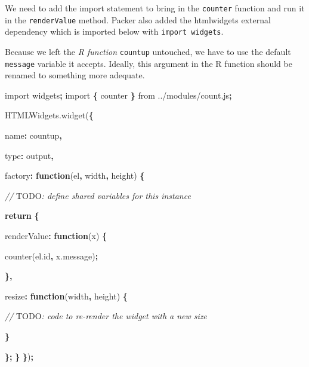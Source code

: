 \documentclass[
  10pt,
]{krantz}
\makeatletter
\newenvironment{Shaded}{\begin{snugshade}}{\end{snugshade}}
\newcommand{\AlertTok}[1]{\textcolor[rgb]{0.33,0.33,0.33}{#1}}
\newcommand{\AttributeTok}[1]{\textcolor[rgb]{0.61,0.61,0.61}{#1}}
\newcommand{\CommentTok}[1]{\textcolor[rgb]{0.37,0.37,0.37}{\textit{#1}}}
\newcommand{\ControlFlowTok}[1]{\textcolor[rgb]{0.27,0.27,0.27}{\textbf{#1}}}
\newcommand{\DataTypeTok}[1]{\textcolor[rgb]{0.27,0.27,0.27}{#1}}
\newcommand{\ImportTok}[1]{#1}
\newcommand{\KeywordTok}[1]{\textcolor[rgb]{0.27,0.27,0.27}{\textbf{#1}}}
\newcommand{\NormalTok}[1]{#1}
\newcommand{\OperatorTok}[1]{\textcolor[rgb]{0.43,0.43,0.43}{\textbf{#1}}}
\newcommand{\StringTok}[1]{\textcolor[rgb]{0.5,0.5,0.5}{#1}}
\newcommand{\VariableTok}[1]{\textcolor[rgb]{0,0,0}{#1}}
\newenvironment{kframe}{%
\medskip{}
\setlength{\fboxsep}{.8em}
 \def\at@end@of@kframe{}%
 \ifinner\ifhmode%
  \def\at@end@of@kframe{\end{minipage}}%
  \begin{minipage}{\columnwidth}%
 \fi\fi%
 \def\FrameCommand##1{\hskip\@totalleftmargin \hskip-\fboxsep
 \colorbox{shadecolor}{##1}\hskip-\fboxsep
     \hskip-\linewidth \hskip-\@totalleftmargin \hskip\columnwidth}%
 \MakeFramed {\advance\hsize-\width
   \@totalleftmargin\z@ \linewidth\hsize
   \@setminipage}}%
 {\par\unskip\endMakeFramed%
 \at@end@of@kframe}
\renewenvironment{Shaded}{\begin{kframe}}{\end{kframe}}
\makeatother
\begin{document}
We need to add the import statement to bring in the \texttt{counter} function and run it in the \texttt{renderValue} method. Packer also added the htmlwidgets external dependency which is imported below with \texttt{import\ \textquotesingle{}widgets\textquotesingle{}}.

Because we left the \emph{R function} \texttt{countup} untouched, we have to use the default \texttt{message} variable it accepts. Ideally, this argument in the R function should be renamed to something more adequate.

\begin{Shaded}
\begin{Highlighting}[]
\ImportTok{import} \StringTok{\textquotesingle{}widgets\textquotesingle{}}\OperatorTok{;}
\ImportTok{import} \OperatorTok{\{}\NormalTok{ counter }\OperatorTok{\}} \ImportTok{from} \StringTok{\textquotesingle{}../modules/count.js\textquotesingle{}}\OperatorTok{;} 

\VariableTok{HTMLWidgets}\NormalTok{.}\AttributeTok{widget}\NormalTok{(}\OperatorTok{\{}

  \DataTypeTok{name}\OperatorTok{:} \StringTok{\textquotesingle{}countup\textquotesingle{}}\OperatorTok{,}

  \DataTypeTok{type}\OperatorTok{:} \StringTok{\textquotesingle{}output\textquotesingle{}}\OperatorTok{,}

  \DataTypeTok{factory}\OperatorTok{:} \KeywordTok{function}\NormalTok{(el}\OperatorTok{,}\NormalTok{ width}\OperatorTok{,}\NormalTok{ height) }\OperatorTok{\{}

    \CommentTok{// }\AlertTok{TODO}\CommentTok{: define shared variables for this instance}

    \ControlFlowTok{return} \OperatorTok{\{}

      \DataTypeTok{renderValue}\OperatorTok{:} \KeywordTok{function}\NormalTok{(x) }\OperatorTok{\{}

        \AttributeTok{counter}\NormalTok{(}\VariableTok{el}\NormalTok{.}\AttributeTok{id}\OperatorTok{,} \VariableTok{x}\NormalTok{.}\AttributeTok{message}\NormalTok{)}\OperatorTok{;}

      \OperatorTok{\},}

      \DataTypeTok{resize}\OperatorTok{:} \KeywordTok{function}\NormalTok{(width}\OperatorTok{,}\NormalTok{ height) }\OperatorTok{\{}

        \CommentTok{// }\AlertTok{TODO}\CommentTok{: code to re{-}render the widget with a new size}

      \OperatorTok{\}}

    \OperatorTok{\};}
  \OperatorTok{\}}
\OperatorTok{\}}\NormalTok{)}\OperatorTok{;}
\end{Highlighting}
\end{Shaded}
\end{document}
